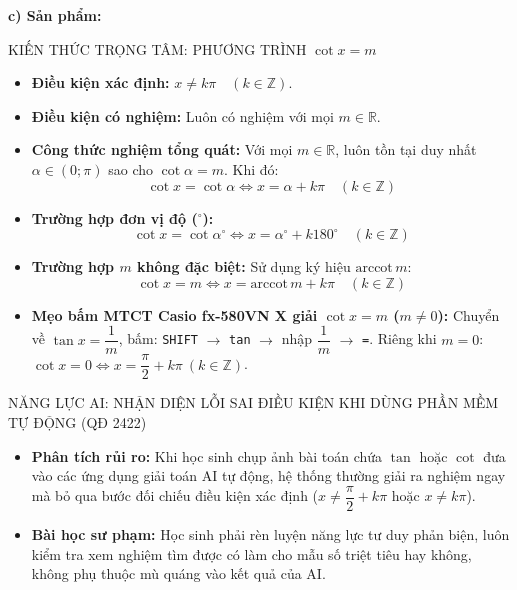 \documentclass[12pt, a4paper]{article}
\begin{document}
\noindent \textbf{c) Sản phẩm:}  
  
\begin{pedabox}{KIẾN THỨC TRỌNG TÂM: PHƯƠNG TRÌNH $\cot x = m$}  
\begin{itemize}[leftmargin=0.6cm]  
    \item \textbf{Điều kiện xác định:} $x \neq k\pi \quad (k \in \mathbb{Z})$.  
    \item \textbf{Điều kiện có nghiệm:} Luôn có nghiệm với mọi $m \in \mathbb{R}$.  
    \item \textbf{Công thức nghiệm tổng quát:}  
    Với mọi $m \in \mathbb{R}$, luôn tồn tại duy nhất $\alpha \in (0; \pi)$ sao cho $\cot\alpha = m$. Khi đó:  
    $$\cot x = \cot\alpha \iff x = \alpha + k\pi \quad (k \in \mathbb{Z})$$  
    \item \textbf{Trường hợp đơn vị độ ($^\circ$):}  
    $$\cot x = \cot\alpha^\circ \iff x = \alpha^\circ + k180^\circ \quad (k \in \mathbb{Z})$$  
    \item \textbf{Trường hợp $m$ không đặc biệt:} Sử dụng ký hiệu $\text{arccot}\, m$:  
    $$\cot x = m \iff x = \text{arccot}\, m + k\pi \quad (k \in \mathbb{Z})$$  
    \item \textbf{Mẹo bấm MTCT Casio fx-580VN X giải $\cot x = m$ ($m \neq 0$):}  
    Chuyển về $\tan x = \dfrac{1}{m}$, bấm: \texttt{SHIFT} $\to$ \texttt{tan} $\to$ nhập $\dfrac{1}{m}$ $\to$ \texttt{=}.  
    Riêng khi $m = 0$: $\cot x = 0 \iff x = \dfrac{\pi}{2} + k\pi \ (k \in \mathbb{Z})$.  
\end{itemize}  
\end{pedabox}  
  
\begin{aibox}{NĂNG LỰC AI: NHẬN DIỆN LỖI SAI ĐIỀU KIỆN KHI DÙNG PHẦN MỀM TỰ ĐỘNG (QĐ 2422)}  
\begin{itemize}[leftmargin=0.6cm]  
    \item \textbf{Phân tích rủi ro:} Khi học sinh chụp ảnh bài toán chứa $\tan$ hoặc $\cot$ đưa vào các ứng dụng giải toán AI tự động, hệ thống thường giải ra nghiệm ngay mà bỏ qua bước đối chiếu điều kiện xác định ($x \neq \dfrac{\pi}{2} + k\pi$ hoặc $x \neq k\pi$).  
    \item \textbf{Bài học sư phạm:} Học sinh phải rèn luyện năng lực tư duy phản biện, luôn kiểm tra xem nghiệm tìm được có làm cho mẫu số triệt tiêu hay không, không phụ thuộc mù quáng vào kết quả của AI.  
\end{itemize}  
\end{aibox}  
  
\end{document}
